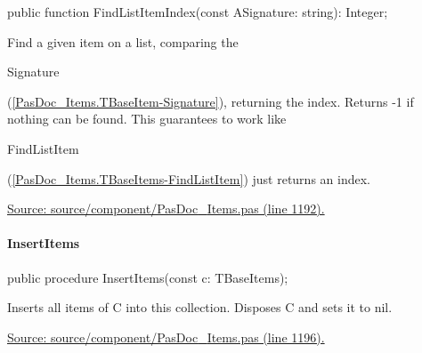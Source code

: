 \documentclass{report}
\newif\ifpdf
\begin{document}
\label{PasDoc_Items.TBaseItems-FindListItemIndex}
\begin{list}{}{
\setlength{\itemindent}{0cm}
\setlength{\listparindent}{0cm}
\setlength{\leftmargin}{\evensidemargin}
\addtolength{\leftmargin}{\tmplength}
\settowidth{\labelsep}{X}
\addtolength{\leftmargin}{\labelsep}
\setlength{\labelwidth}{\tmplength}
}
\item[\textbf{Declaration}\hfill]
\ifpdf
\begin{flushleft}
\fi
\begin{ttfamily}
public function FindListItemIndex(const ASignature: string): Integer;\end{ttfamily}

\ifpdf
\end{flushleft}
\fi

\par
\item[\textbf{Description}]
Find a given item on a list, comparing the \begin{ttfamily}Signature\end{ttfamily}(\ref{PasDoc_Items.TBaseItem-Signature}), returning the index. Returns {-}1 if nothing can be found. This guarantees to work like \begin{ttfamily}FindListItem\end{ttfamily}(\ref{PasDoc_Items.TBaseItems-FindListItem}) just returns an index.\par
\href{https://github.com/pasdoc/pasdoc/blob/master/source/component/PasDoc_Items.pas#L1192}{Source: source/component/PasDoc{\_}Items.pas (line 1192).}

\end{list}
\paragraph*{InsertItems}\hspace*{\fill}

\label{PasDoc_Items.TBaseItems-InsertItems}
\begin{list}{}{
\setlength{\itemindent}{0cm}
\setlength{\listparindent}{0cm}
\setlength{\leftmargin}{\evensidemargin}
\addtolength{\leftmargin}{\tmplength}
\settowidth{\labelsep}{X}
\addtolength{\leftmargin}{\labelsep}
\setlength{\labelwidth}{\tmplength}
}
\item[\textbf{Declaration}\hfill]
\ifpdf
\begin{flushleft}
\fi
\begin{ttfamily}
public procedure InsertItems(const c: TBaseItems);\end{ttfamily}

\ifpdf
\end{flushleft}
\fi

\par
\item[\textbf{Description}]
Inserts all items of C into this collection. Disposes C and sets it to nil.\par
\href{https://github.com/pasdoc/pasdoc/blob/master/source/component/PasDoc_Items.pas#L1196}{Source: source/component/PasDoc{\_}Items.pas (line 1196).}

\end{list}
\end{document}
